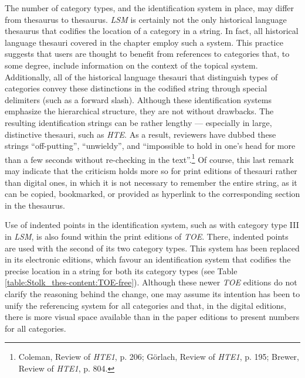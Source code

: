 The number of category types, and the identification system in place, may differ from thesaurus to thesaurus. 
\textit{LSM} is certainly not the only historical language thesaurus that codifies the location of a category in a string. In fact, all historical language thesauri covered in the chapter employ such a system. This practice suggests that users are thought to benefit from references to categories that, to some degree, include information on the context of the topical system. Additionally, all of the historical language thesauri that distinguish types of categories convey these distinctions in the codified string through special delimiters (such as a forward slash). Although these identification systems emphasize the hierarchical structure, they are not without drawbacks. The resulting identification strings can be rather lengthy --- especially in large, distinctive thesauri, such as \textit{HTE}. As a result, reviewers have dubbed these strings ``off-putting'', ``unwieldy'', and ``impossible to hold in one's head for more than a few seconds without re-checking in the text''.\footnote{Coleman, Review of \textit{HTE1}, %
p. 206; Görlach, Review of \textit{HTE1}, %
p. 195; Brewer, Review of \textit{HTE1}, %
p. 804.} Of course, this last remark may indicate that the criticism holds more so for print editions of thesauri rather than digital ones, in which it is not necessary to remember the entire string, as it can be copied, bookmarked, or provided as hyperlink to the corresponding section in the thesaurus.

Use of indented points in the identification system, such as with category type III in \textit{LSM}, is also found within the print editions of \textit{TOE}. There, indented points are used with the second of its two category types. This system has been replaced in its electronic editions, which favour an identification system that codifies the precise location in a string for both its category types (see Table \ref{table:Stolk_thes-content:TOE-free}). Although these newer \textit{TOE} editions do not clarify the reasoning behind the change, one may assume its intention has been to unify the referencing system for all categories and that, in the digital editions, there is more visual space available than in the paper editions to present numbers for all categories.

